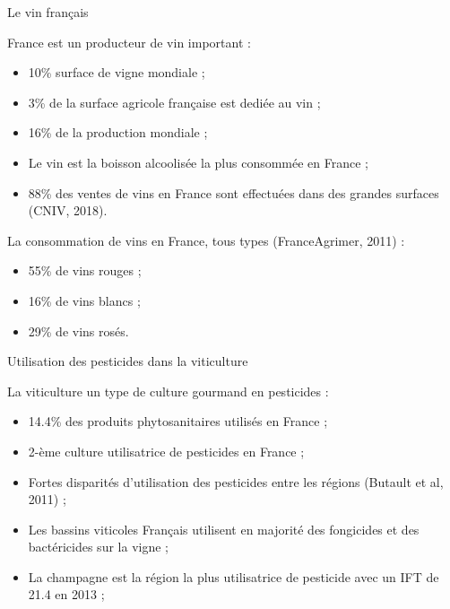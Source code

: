 \documentclass[11pt,ignorenonframetext,]{beamer}
\providecommand{\tightlist}{%
  \setlength{\itemsep}{0pt}\setlength{\parskip}{0pt}}
\begin{document}
\begin{frame}{Le vin français}
\protect\hypertarget{le-vin-francais}{}

France est un producteur de vin important :

\begin{itemize}
\tightlist
\item
  10\% surface de vigne mondiale ;
\item
  3\% de la surface agricole française est dediée au vin ;
\item
  16\% de la production mondiale ;
\item
  Le vin est la boisson alcoolisée la plus consommée en France ;
\item
  88\% des ventes de vins en France sont effectuées dans des grandes
  surfaces (CNIV, 2018).
\end{itemize}

La consommation de vins en France, tous types (FranceAgrimer, 2011) :

\begin{itemize}
\tightlist
\item
  55\% de vins rouges ;
\item
  16\% de vins blancs ;
\item
  29\% de vins rosés.
\end{itemize}

\end{frame}

\begin{frame}{Utilisation des pesticides dans la viticulture}
\protect\hypertarget{utilisation-des-pesticides-dans-la-viticulture}{}

La viticulture un type de culture gourmand en pesticides :

\begin{itemize}
\tightlist
\item
  14.4\% des produits phytosanitaires utilisés en France ;
\item
  2-ème culture utilisatrice de pesticides en France ;
\item
  Fortes disparités d'utilisation des pesticides entre les régions
  (Butault et al, 2011) ;
\item
  Les bassins viticoles Français utilisent en majorité des fongicides et
  des bactéricides sur la vigne ;
\item
  La champagne est la région la plus utilisatrice de pesticide avec un
  IFT de 21.4 en 2013 ;
\end{itemize}

\end{frame}
\end{document}
